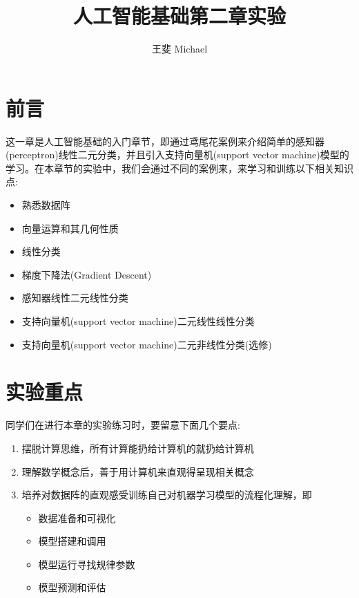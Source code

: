 \documentclass[11pt]{article}
\theoremstyle{definition}
\numberwithin{equation}{section}
\begin{document}


\title{人工智能基础第二章实验}
\author{王斐 Michael}
\date{}

\maketitle

\section{前言}

这一章是人工智能基础的入门章节，即通过鸢尾花案例来介绍简单的感知器(perceptron)线性二元分类，并且引入支持向量机(support vector machine)模型的学习。在本章节的实验中，我们会通过不同的案例来，来学习和训练以下相关知识点:
\begin{itemize}
	\item 熟悉数据阵
	\item 向量运算和其几何性质
	\item 线性分类
	\item 梯度下降法(Gradient Descent)
	\item 感知器线性二元线性分类
	\item 支持向量机(support vector machine)二元线性线性分类
	\item 支持向量机(support vector machine)二元非线性分类(选修)
\end{itemize}

\section{实验重点}

同学们在进行本章的实验练习时，要留意下面几个要点:
\begin{enumerate}
	\item 摆脱计算思维，所有计算能扔给计算机的就扔给计算机
	\item 理解数学概念后，善于用计算机来直观得呈现相关概念
	\item 培养对数据阵的直观感受训练自己对机器学习模型的流程化理解，即 \begin{itemize}
		\item 数据准备和可视化
		\item 模型搭建和调用
		\item 模型运行寻找规律参数
		\item 模型预测和评估
	\end{itemize}
\end{enumerate}
\end{document}
